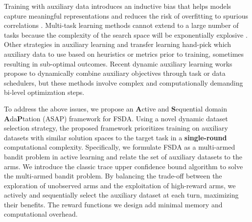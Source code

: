 Training with auxiliary data introduces an inductive bias that helps models capture meaningful representations and reduces the risk of overfitting to spurious correlations \cite{navon2021auxiliary}.
Multi-task learning methods \cite{graham2023one} cannot extend to a large number of tasks because the complexity of the search space will be exponentially explosive \cite{albalak2024improving}.
Other strategies in auxiliary learning and transfer learning hand-pick which auxiliary data to use based on heuristics \cite{yang2021joint} or metrics \cite{yu2020gradient} prior to training, sometimes resulting in sub-optimal outcomes.
Recent dynamic auxiliary learning works \cite{navon2021auxiliary} propose to dynamically combine auxiliary objectives through task or data schedulers, but these methods involve complex and computationally demanding bi-level optimization steps.

To address the above issues, we propose an \textbf{A}ctive and \textbf{S}equential domain \textbf{A}da\textbf{P}tation (ASAP) framework for FSDA.
Using a novel dynamic dataset selection strategy,
the proposed framework prioritizes training on auxiliary datasets with similar solution spaces to the target task in a \textbf{single-round} computational complexity.
Specifically,
we formulate FSDA as a multi-armed bandit problem in active learning \cite{macready1998bandit} and relate the set of auxiliary datasets to the arms.
We introduce the classic trace upper confidence bound algorithm \cite{auer2002finite} to solve the multi-armed bandit problem.
By balancing the trade-off between the exploration of unobserved arms and the exploitation of high-reward arms, we actively and sequentially select the auxiliary dataset at each turn, maximizing their benefits.
The reward functions we design add minimal memory and computational overhead.

